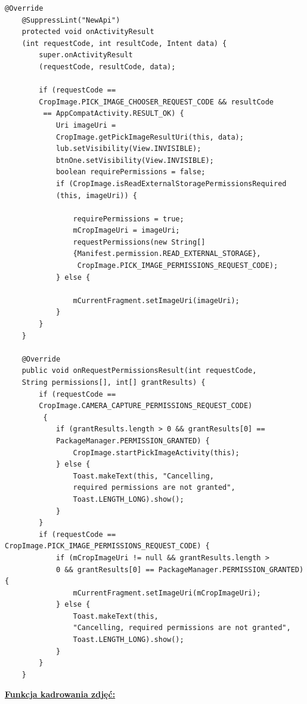 \begin{verbatim}
@Override
    @SuppressLint("NewApi")
    protected void onActivityResult
    (int requestCode, int resultCode, Intent data) {
        super.onActivityResult
        (requestCode, resultCode, data);

        if (requestCode == 
        CropImage.PICK_IMAGE_CHOOSER_REQUEST_CODE && resultCode
         == AppCompatActivity.RESULT_OK) {
            Uri imageUri = 
            CropImage.getPickImageResultUri(this, data);
            lub.setVisibility(View.INVISIBLE);
            btnOne.setVisibility(View.INVISIBLE);
            boolean requirePermissions = false;
            if (CropImage.isReadExternalStoragePermissionsRequired
            (this, imageUri)) {

                requirePermissions = true;
                mCropImageUri = imageUri;
                requestPermissions(new String[]
                {Manifest.permission.READ_EXTERNAL_STORAGE},
                 CropImage.PICK_IMAGE_PERMISSIONS_REQUEST_CODE);
            } else {

                mCurrentFragment.setImageUri(imageUri);
            }
        }
    }

    @Override
    public void onRequestPermissionsResult(int requestCode, 
    String permissions[], int[] grantResults) {
        if (requestCode == 
        CropImage.CAMERA_CAPTURE_PERMISSIONS_REQUEST_CODE)
         {
            if (grantResults.length > 0 && grantResults[0] == 
            PackageManager.PERMISSION_GRANTED) {
                CropImage.startPickImageActivity(this);
            } else {
                Toast.makeText(this, "Cancelling, 
                required permissions are not granted", 
                Toast.LENGTH_LONG).show();
            }
        }
        if (requestCode == CropImage.PICK_IMAGE_PERMISSIONS_REQUEST_CODE) {
            if (mCropImageUri != null && grantResults.length > 
            0 && grantResults[0] == PackageManager.PERMISSION_GRANTED) {
                mCurrentFragment.setImageUri(mCropImageUri);
            } else {
                Toast.makeText(this, 
                "Cancelling, required permissions are not granted", 
                Toast.LENGTH_LONG).show();
            }
        }
    }
\end{verbatim}
\begin{center}
\underline{\textbf{Funkcja kadrowania zdjęć:}}
\end{center}
